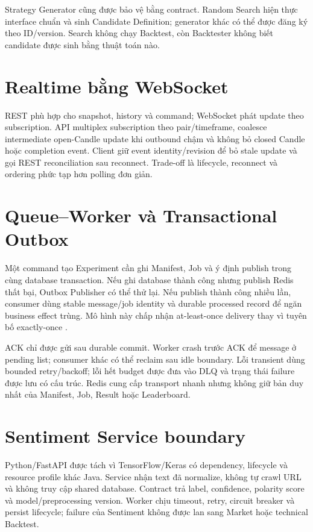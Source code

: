 \documentclass[12pt,a4paper,oneside]{report}
\begin{document}
Strategy Generator cũng được bảo vệ bằng contract. Random Search hiện thực interface chuẩn và sinh Candidate Definition; generator khác có thể được đăng ký theo ID/version. Search không chạy Backtest, còn Backtester không biết candidate được sinh bằng thuật toán nào.

\section{Realtime bằng WebSocket}

REST phù hợp cho snapshot, history và command; WebSocket phát update theo subscription. API multiplex subscription theo pair/timeframe, coalesce intermediate open-Candle update khi outbound chậm và không bỏ closed Candle hoặc completion event. Client giữ event identity/revision để bỏ stale update và gọi REST reconciliation sau reconnect. Trade-off là lifecycle, reconnect và ordering phức tạp hơn polling đơn giản.

\section{Queue--Worker và Transactional Outbox}

Một command tạo Experiment cần ghi Manifest, Job và ý định publish trong cùng database transaction. Nếu ghi database thành công nhưng publish Redis thất bại, Outbox Publisher có thể thử lại. Nếu publish thành công nhiều lần, consumer dùng stable message/job identity và durable processed record để ngăn business effect trùng. Mô hình này chấp nhận at-least-once delivery thay vì tuyên bố exactly-once \cite{richardson2019,kleppmann2017}.

ACK chỉ được gửi sau durable commit. Worker crash trước ACK để message ở pending list; consumer khác có thể reclaim sau idle boundary. Lỗi transient dùng bounded retry/backoff; lỗi hết budget được đưa vào DLQ và trạng thái failure được lưu có cấu trúc. Redis cung cấp transport nhanh nhưng không giữ bản duy nhất của Manifest, Job, Result hoặc Leaderboard.

\section{Sentiment Service boundary}

Python/FastAPI được tách vì TensorFlow/Keras có dependency, lifecycle và resource profile khác Java. Service nhận text đã normalize, không tự crawl URL và không truy cập shared database. Contract trả label, confidence, polarity score và model/preprocessing version. Worker chịu timeout, retry, circuit breaker và persist lifecycle; failure của Sentiment không được lan sang Market hoặc technical Backtest.
\end{document}
